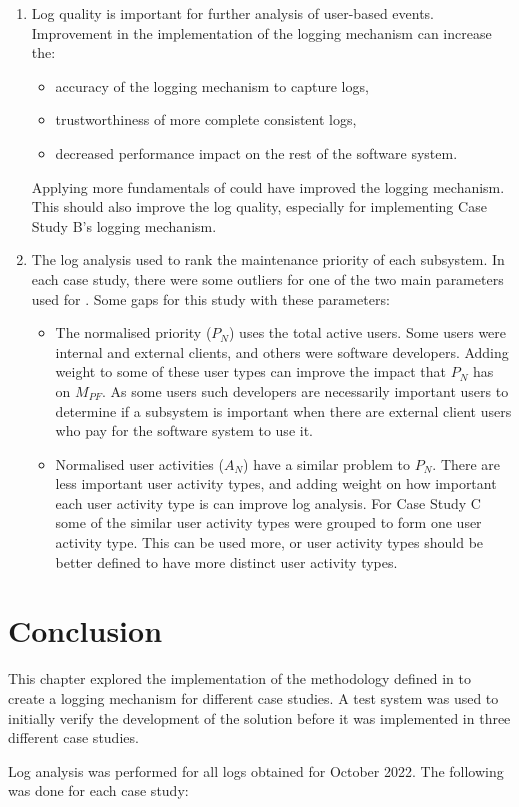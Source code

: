 \begin{enumerate}
	\item Log quality is important for further analysis of user-based events. Improvement in the implementation of the logging mechanism can increase the:
		\begin{itemize}
			\item accuracy of the logging mechanism to capture logs,
			\item trustworthiness of more complete consistent logs,
			\item decreased performance impact on the rest of the software system.
		\end{itemize}
	Applying more fundamentals of  could have improved the logging mechanism. This should also improve the log quality, especially for implementing Case Study B's logging mechanism.
	\item The log analysis used  to rank the maintenance priority of each subsystem. In each case study, there were some outliers for one of the two main parameters used for . Some gaps for this study with these parameters:
		\begin{itemize}
			\item The normalised priority ($P_N$) uses the total active users. Some users were internal and external clients, and others were software developers. Adding weight to some of these user types can improve the impact that $P_N$ has on $M_{PF}$. As some users such developers are necessarily important users to determine if a subsystem is important when there are external client users who pay for the software system to use it.
			\item Normalised user activities ($A_N$) have a similar problem to $P_N$. There are less important user activity types, and adding weight on how important each user activity type is can improve log analysis. For Case Study C some of the similar user activity types were grouped to form one user activity type. This can be used more, or user activity types should be better defined to have more distinct user activity types.
		\end{itemize}
\end{enumerate}

\section{Conclusion}
This chapter explored the implementation of the methodology defined in  to create a logging mechanism for different case studies. A test system was used to initially verify the development of the solution before it was implemented in three different case studies.\par Log analysis was performed for all logs obtained for October 2022. The following was done for each case study:

